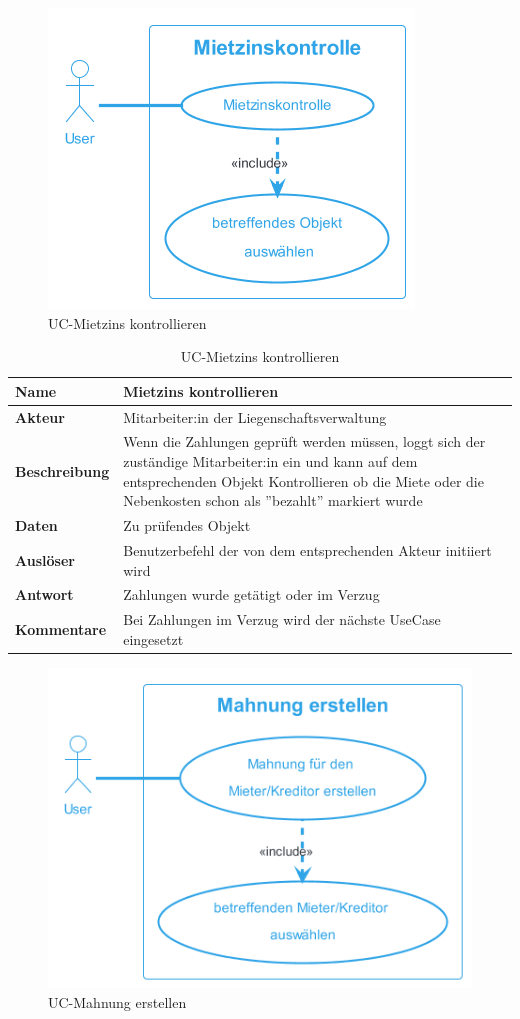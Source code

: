 \begin{figure}[H]
  \begin{center}
    \includegraphics[width=0.4\linewidth]{content/diagrams/out/usecase/mietzinsKontrollieren/MietzinsKontrollieren.png}
    \caption{UC-Mietzins kontrollieren}
    \label{MietzinsKontrollieren}
  \end{center}
\end{figure}

\begin{table}[H]
  \centering
  \settowidth{}
  \setlength\extrarowheight{2pt}
  \begin{tabulary}{1.0\textwidth}{|a|m{14cm}|}
    \hline
    \textbf{Name}& Mietzins kontrollieren\\
    \hline
    \textbf{Akteur}& Mitarbeiter:in der Liegenschaftsverwaltung\\
    \hline 
    \textbf{Beschreibung} & Wenn die Zahlungen geprüft werden müssen, loggt sich der zuständige Mitarbeiter:in ein und kann auf dem entsprechenden Objekt Kontrollieren ob die Miete oder die Nebenkosten schon als ''bezahlt'' markiert wurde\\
    \hline
    \textbf{Daten} & Zu prüfendes Objekt\\
    \hline
    \textbf{Auslöser} & Benutzerbefehl der von dem entsprechenden Akteur initiiert wird\\
    \hline
    \textbf{Antwort} & Zahlungen wurde getätigt oder im Verzug\\
    \hline
    \textbf{Kommentare} & Bei Zahlungen im Verzug wird der nächste UseCase  eingesetzt\\
    \hline
  \end{tabulary}
  \caption{UC-Mietzins kontrollieren}
\end{table}

\newpage

\begin{figure}[H]
  \begin{center}
    \includegraphics[width=0.5\linewidth]{content/diagrams/out/usecase/mahnungGenerieren/MahnungErstellen.png}
    \caption{UC-Mahnung erstellen}
    \label{mahnung}
  \end{center}
\end{figure}

